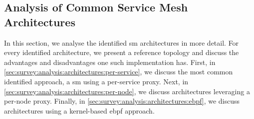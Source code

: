 


\subsection{Analysis of Common Service Mesh Architectures}
\label{sec:survey:analysis:architectures}

In this section, we analyse the identified \gls{sm} architectures in more detail. For every identified architecture, we present a reference topology and discuss the advantages and disadvantages one such implementation has. First, in \cref{sec:survey:analysis:architectures:per-service}, we discuss the most common identified approach, a \gls{sm} using a per-service proxy. Next, in \cref{sec:survey:analysis:architectures:per-node}, we discuss architectures leveraging a per-node proxy. Finally, in \cref{sec:survey:analysis:architectures:ebpf}, we discuss architectures using a kernel-based \gls{ebpf} approach.



